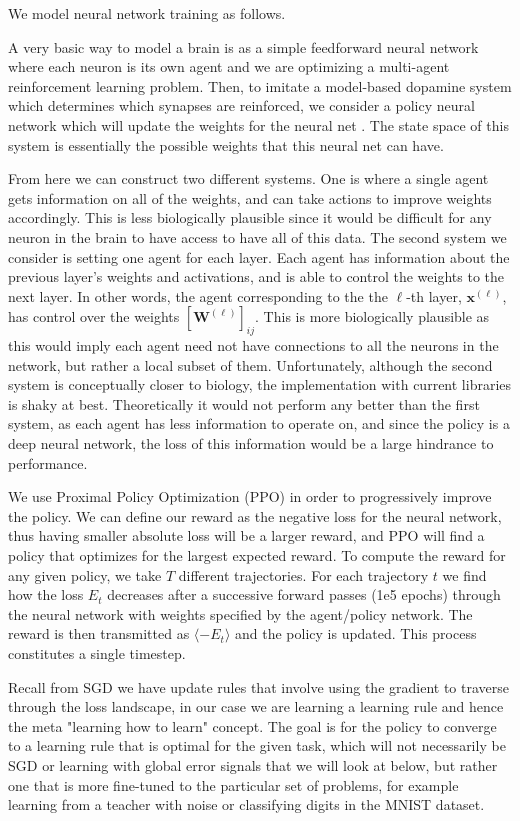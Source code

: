 \documentclass{article}
\def\*#1{\mathbf{#1}}
\begin{document}
We model neural network training as follows.

A very basic way to model a brain is as a simple feedforward neural network 
where each neuron is its own agent and we are optimizing a multi-agent reinforcement learning problem. 
Then, to imitate a model-based dopamine
system which determines which synapses are reinforced, we consider a policy
neural network which will update the weights for the neural net \cite{wang2018pfc, botvinick2019408}. The state space of
this system is essentially the possible weights that this neural net can have. 

From here we can construct two different
systems. One is where a single agent gets information on all of the weights,
and can take actions to improve weights accordingly. This is less biologically plausible since it would be difficult
for any neuron in the brain to have access to have all of this data. The second system we consider is setting one agent
for each layer. Each agent has information about the previous layer's weights and activations, and is able to control
the weights to the next layer. In other words, the agent corresponding to the the $\ell$-th layer, $\*x^{(\ell)}$, has control over the weights 
$[\*W^{(\ell)}]_{ij}$. This is more biologically plausible as this would imply each agent need not have connections to all the neurons in 
the network, but rather a local subset of them. Unfortunately, although the second system is conceptually closer to biology, the implementation
with current libraries is shaky at best. Theoretically it would not perform any better than the first system, as each agent has less information
to operate on, and since the policy is a deep neural network, the loss of this information would be a large hindrance to performance.

We use Proximal Policy Optimization (PPO) in order to progressively improve the policy. We can define
our reward as the negative loss for the neural network, thus having smaller absolute loss will be a larger reward, and
PPO will find a policy that optimizes for the largest expected reward. To compute the reward for any given policy, we 
take $T$ different trajectories. For each trajectory $t$ we find how the loss $E_t$ 
decreases after a successive forward passes (1e5 epochs) through the neural 
network with weights specified by the agent/policy network. The reward is 
then transmitted as $\langle - E_t \rangle$ and the policy is updated. This process constitutes a single timestep.

Recall from SGD we have update rules that involve using the gradient to traverse through the loss landscape,
in our case we are learning a learning rule and hence the meta "learning how to learn" concept. The goal is for
the policy to converge to a learning rule that is optimal for the given task, which will not necessarily be SGD
or learning with global error signals that we will look at below, but rather one that is more fine-tuned to the particular
set of problems, for example learning from a teacher with noise or classifying digits in the MNIST dataset.
\end{document}
